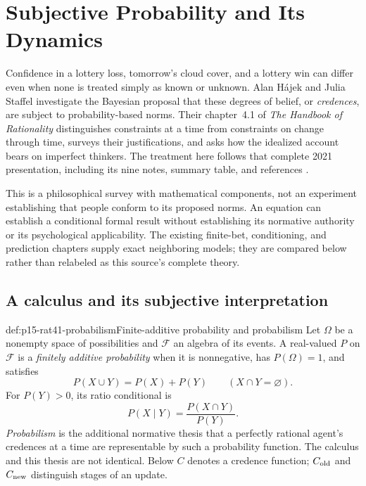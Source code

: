 \chapter{Subjective Probability and Its Dynamics}
\label{sec:p15-rationality-4-1}

Confidence in a lottery loss, tomorrow's cloud cover, and a lottery win can
differ even when none is treated simply as known or unknown. Alan H\'ajek
and Julia Staffel investigate the Bayesian proposal that these degrees of
belief, or \emph{credences}, are subject to probability-based norms. Their
chapter~4.1 of \emph{The Handbook of Rationality} distinguishes constraints
at a time from constraints on change through time, surveys their
justifications, and asks how the idealized account bears on imperfect
thinkers. The treatment here follows that complete 2021 presentation,
including its nine notes, summary table, and references
\parencite[pp.~239--251]{HajekStaffel2021Dynamics}.

This is a philosophical survey with mathematical components, not an
experiment establishing that people conform to its proposed norms.
An equation can establish a conditional formal result without establishing
its normative authority or its psychological applicability. The existing
finite-bet, conditioning, and prediction chapters supply exact neighboring
models; they are compared below rather than relabeled as this source's
complete theory.

\section{A calculus and its subjective interpretation}
\label{sec:p15-rat41-calculus}

\begin{hbdefinition}{def:p15-rat41-probabilism}{Finite-additive probability and probabilism}
Let \(\Omega\) be a nonempty space of possibilities and \(\mathcal F\)
an algebra of its events. A real-valued \(P\) on \(\mathcal F\) is a
\emph{finitely additive probability} when it is nonnegative, has
\(P(\Omega)=1\), and satisfies
\[
 P(X\cup Y)=P(X)+P(Y)\qquad(X\cap Y=\varnothing).
\]
For \(P(Y)>0\), its ratio conditional is
\[
                  P(X\mid Y)=\frac{P(X\cap Y)}{P(Y)}.
\]
\emph{Probabilism} is the additional normative thesis that a perfectly
rational agent's credences at a time are representable by such a
probability function. The calculus and this thesis are not identical.
Below \(C\) denotes a credence function; \(C_{\rm old}\) and
\(C_{\rm new}\) distinguish stages of an update.
\end{hbdefinition}

